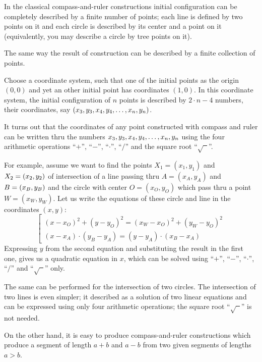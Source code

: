 In the classical compass-and-ruler constructions initial configuration can be completely described by a finite number of points;
each line is defined by two points on it and each circle is described by its center and a point on it (equivalently, you may describe a circle by tree points on it).

The same way the result of construction can be described by a finite collection of points.

Choose a  coordinate system, such that one of the initial points as the origin $(0,0)$ and yet an other initial point has coordinates $(1,0)$.
In this coordinate system,
the initial configuration of $n$ points is described by 
$2\cdot n-4$ numbers, their coordinates, say $(x_3,y_3,x_4,y_4,\z\dots,x_n,y_n)$.

\medskip

It turns out that the coordinates of any point constructed with compass and ruler
can be written thru the numbers $x_3,y_3,x_4,y_4,\z\dots,x_n,y_n$ using the four arithmetic operations ``$+$'', ``$-$'', ``$\cdot$'', ``$/$''
and the square root ``$\sqrt{\phantom{a}}$''.

For example, assume we want to find the points $X_1=(x_1,y_1)$ and $X_2\z=(x_2,y_2)$ of intersection of 
a line passing thru $A=(x_A,y_A)$ and $B\z=(x_B,y_B)$ and
the circle with center $O=(x_O,y_O)$ which pass thru a point $W=(x_W,y_W)$.
Let us write the equations of these circle and line in the coordinates $(x,y)$:
$$
\left[
\begin{matrix}
(x-x_O)^2+(y-y_O)^2=(x_W-x_O)^2+(y_W-y_O)^2    
\\
(x-x_A)\cdot(y_B-y_A)=(y-y_A)\cdot(x_B-x_A)  
\end{matrix}
\right.
$$
Expressing $y$ from the second equation and substituting the result in the first one, gives us a quadratic equation in $x$, 
which can be solved using ``$+$'', ``$-$'', ``$\cdot$'', ``$/$''
and  ``$\sqrt{\phantom{a}}$'' only.

The same can be performed for the intersection of two circles. 
The intersection of two lines is even simpler; 
it described as a solution of two linear equations and can be expressed using only four arithmetic operations;
the square root ``$\sqrt{\phantom{a}}$'' is not needed.

\medskip

On the other hand, it is easy to produce  compass-and-ruler constructions which produce a segment of length $a+b$ and $a-b$ from two given segments of lengths $a>b$.

